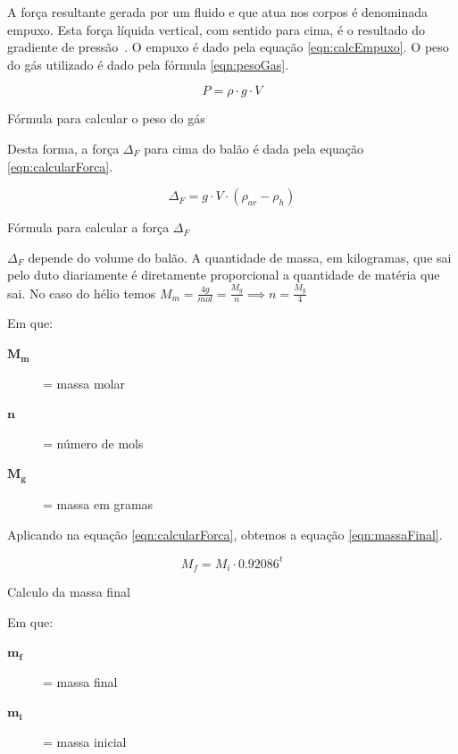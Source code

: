 	A força resultante gerada por um  fluido e que atua nos corpos é denominada empuxo. Esta força líquida vertical, com sentido para cima, é o resultado do gradiente de pressão~\cite{munson}. O empuxo é dado pela equação \eqref{eqn:calcEmpuxo}.	O peso do gás utilizado é dado pela fórmula \eqref{eqn:pesoGas}.

	\begin{equacao}
		\begin{equation}
			P = \rho \cdot g \cdot V
		\end{equation}
		\caption{Fórmula para calcular o peso do gás}
		\label{eqn:pesoGas}
	\end{equacao}

	Desta forma, a força $\Delta_{F}$ para cima do balão é dada pela equação \eqref{eqn:calcularForca}.

	\begin{equacao}
		\begin{equation}
			\Delta_{F} = g \cdot V \cdot (\rho_{ar} - \rho_{h})
		\end{equation}
		\caption{Fórmula para calcular a força $\Delta_{F}$}
		\label{eqn:calcularForca}
	\end{equacao}

	$\Delta_{F}$ depende do volume do balão. A quantidade de massa, em kilogramas, que sai pelo duto diariamente é diretamente proporcional a quantidade de matéria que sai. No caso do hélio temos $M_{m} = \frac{4g}{mol} = \frac{M_{g}}{n} \implies n = \frac{M_{g}}{4}$

	Em que:
	\begin{description}
		\item[$\boldsymbol{M_m}$] = massa molar
		\item[$\boldsymbol{n}$] = número de mols
		\item[$\boldsymbol{M_g}$] = massa em gramas
	\end{description}

	Aplicando na equação \eqref{eqn:calcularForca}, obtemos a equação \eqref{eqn:massaFinal}.

	\begin{equacao}
		\begin{equation}
			M_f = M_i \cdot 0.92086^t
		\end{equation}
		\caption{Calculo da massa final}
		\label{eqn:massaFinal}
	\end{equacao}

	Em que:
	\begin{description}
		\item[$\boldsymbol{m_f}$] = massa final
		\item[$\boldsymbol{m_i}$] = massa inicial
	\end{description}


